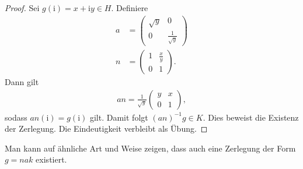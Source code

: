 \begin{proof}
Sei $g(\mathrm{i})=x+\mathrm{i}y\in H$.
Definiere
\begin{align*}
a&=\begin{pmatrix}
\sqrt{y}&0\\
0&\frac{1}{\sqrt{y}}
\end{pmatrix}\\
n&=\begin{pmatrix}
1&\frac{x}{y}\\
0&1
\end{pmatrix}.
\end{align*}
Dann gilt
\begin{align*}
an=\frac{1}{\sqrt{y}} \begin{pmatrix}
y&x\\
0&1
\end{pmatrix},
\end{align*}
sodass $an(\mathrm{i})=g(\mathrm{i})$ gilt.
Damit folgt $(an)^{-1} g \in K$.
Dies beweist die Existenz der Zerlegung.
Die Eindeutigkeit verbleibt als Übung.
\end{proof}
Man kann auf ähnliche Art und Weise zeigen, dass auch eine Zerlegung der Form $g=nak$ existiert.


